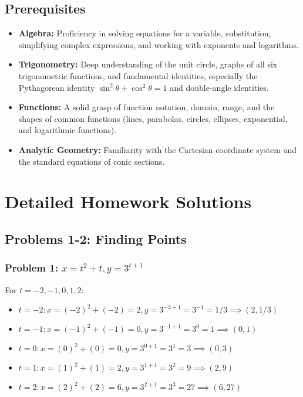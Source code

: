 \documentclass{article}
\begin{document}
\subsection{Prerequisites}
\begin{itemize}
    \item \textbf{Algebra:} Proficiency in solving equations for a variable, substitution, simplifying complex expressions, and working with exponents and logarithms.
    \item \textbf{Trigonometry:} Deep understanding of the unit circle, graphs of all six trigonometric functions, and fundamental identities, especially the Pythagorean identity \(\sin^2\theta + \cos^2\theta = 1\) and double-angle identities.
    \item \textbf{Functions:} A solid grasp of function notation, domain, range, and the shapes of common functions (lines, parabolas, circles, ellipses, exponential, and logarithmic functions).
    \item \textbf{Analytic Geometry:} Familiarity with the Cartesian coordinate system and the standard equations of conic sections.
\end{itemize}

\section{Detailed Homework Solutions}

\subsection{Problems 1-2: Finding Points}
\subsubsection{Problem 1: \(x = t^2 + t, y = 3^{t+1}\)}
For \(t = -2, -1, 0, 1, 2\):
\begin{itemize}
    \item \(t=-2: x=(-2)^2+(-2)=2, y=3^{-2+1}=3^{-1}=1/3 \implies (2, 1/3)\)
    \item \(t=-1: x=(-1)^2+(-1)=0, y=3^{-1+1}=3^0=1 \implies (0, 1)\)
    \item \(t=0: x=(0)^2+(0)=0, y=3^{0+1}=3^1=3 \implies (0, 3)\)
    \item \(t=1: x=(1)^2+(1)=2, y=3^{1+1}=3^2=9 \implies (2, 9)\)
    \item \(t=2: x=(2)^2+(2)=6, y=3^{2+1}=3^3=27 \implies (6, 27)\)
\end{itemize}
\end{document}

